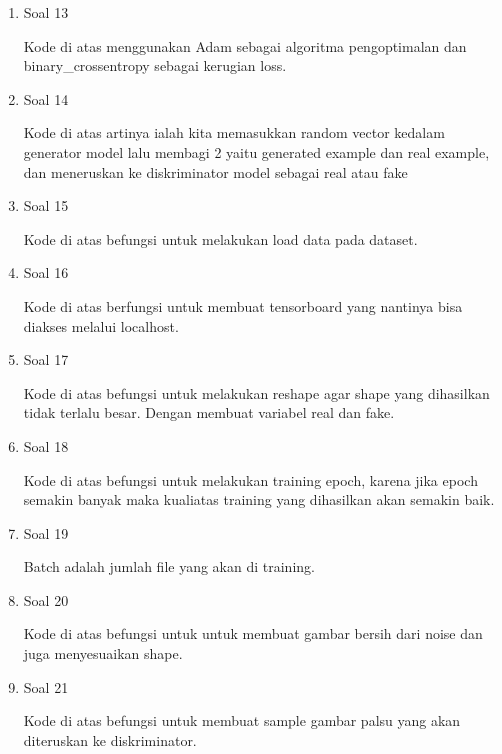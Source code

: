 \begin{enumerate}
    \item Soal 13
	\hfill\break
	
    Kode di atas menggunakan Adam sebagai algoritma pengoptimalan dan binary\_crossentropy sebagai kerugian loss. 
    
    \item Soal 14
	\hfill\break
	
	Kode di atas artinya ialah kita memasukkan random vector kedalam generator model lalu membagi 2 yaitu generated example dan real example, dan meneruskan ke diskriminator model sebagai real atau fake

    \item Soal 15
	\hfill\break
	
    Kode di atas befungsi untuk melakukan load data pada dataset.
    
    \item Soal 16
	\hfill\break
	
    Kode di atas berfungsi untuk membuat tensorboard yang nantinya bisa diakses melalui localhost.
    
    \item Soal 17
	\hfill\break
	
    Kode di atas befungsi untuk melakukan reshape agar shape yang dihasilkan tidak terlalu besar. Dengan membuat variabel real dan fake.
    
    \item Soal 18
	\hfill\break
	
	Kode di atas befungsi untuk melakukan training epoch, karena jika epoch semakin banyak maka kualiatas training yang dihasilkan akan semakin baik.

    \item Soal 19
	\hfill\break
	
    Batch adalah jumlah file yang akan di training.
    
    \item Soal 20
	\hfill\break
	
    Kode di atas befungsi untuk untuk membuat gambar bersih dari noise dan juga menyesuaikan shape.
    
    \item Soal 21
	\hfill\break
	
    Kode di atas befungsi untuk membuat sample gambar palsu yang akan diteruskan ke diskriminator.
    

\end{enumerate}
